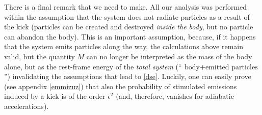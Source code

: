 \documentclass[twocolumn,usenatbib]{mnras2}
\begin{document}
There is a final remark that we need to make. All our analysis was performed within the assumption that the system does not radiate particles as a result of the kick (particles can be created and destroyed \textit{inside the body}, but no particle can abandon the body). This is an important assumption, because, if it happens that the system emits particles along the way, the calculations above remain valid, but the quantity $M$ can no longer be interpreted as the mass of the body alone, but as the rest-frame energy of the \textit{total system} (``$\, \text{body}+\text{emitted particles} \,$'') invalidating the assumptions that lead to \eqref{dse}. Luckily, one can easily prove (see appendix \ref{emmizuz}) that also the probability of stimulated emissions induced by a kick is of the order $\epsilon^2$ (and, therefore, vanishes for adiabatic accelerations).






\end{document}
